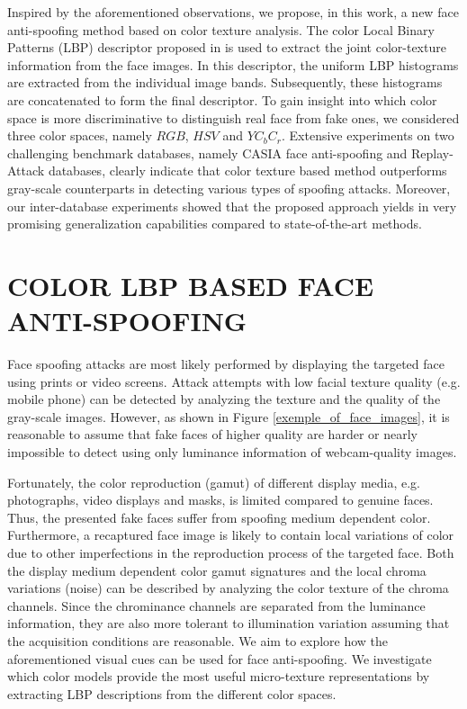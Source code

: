 \documentclass{article}
\begin{document}
Inspired by the aforementioned observations, we propose, in this work, a new face anti-spoofing method based on color texture analysis. The color Local Binary Patterns (LBP) descriptor proposed in \cite{color_lbp} is used to extract the joint color-texture information from the face images. In this descriptor, the uniform LBP histograms are extracted from the individual image bands. Subsequently, these histograms are concatenated to form the final descriptor. To gain insight into which color space is more discriminative to distinguish real face from fake ones, we considered three color spaces, namely $RGB$, $HSV$ and $YC_bC_r$. Extensive experiments on two challenging benchmark databases, namely CASIA face anti-spoofing and Replay-Attack databases, clearly indicate that color texture based method outperforms gray-scale counterparts in detecting various types of spoofing attacks. Moreover, our inter-database experiments showed that the proposed approach yields in very promising generalization capabilities compared to state-of-the-art methods.



\vspace{-4mm}
\section{COLOR LBP BASED FACE ANTI-SPOOFING }
	\vspace{-2mm}
\label{sec:lbp}

Face spoofing attacks are most likely performed by displaying the targeted face using prints or video screens. Attack attempts with low facial texture quality (e.g. mobile phone) can be detected by analyzing the texture and the quality of the gray-scale images. However, as shown in Figure \ref{exemple_of_face_images}, it is reasonable to assume that fake faces of higher quality are harder or nearly impossible to detect using only luminance information of webcam-quality images.

Fortunately, the color reproduction (gamut) of different display media, e.g. photographs, video displays and masks, is limited compared to genuine faces. Thus, the presented fake faces suffer from spoofing medium dependent color. Furthermore, a recaptured face image is likely to contain local variations of color due to other imperfections in the reproduction process of the targeted face. Both the display medium dependent color gamut signatures and the local chroma variations (noise) can be described by analyzing the color texture of the chroma channels. Since the chrominance channels are separated from the luminance information, they are also more tolerant to illumination variation assuming that the acquisition conditions are reasonable. We aim to explore how the aforementioned visual cues can be used for face anti-spoofing. We investigate which color models provide the most useful micro-texture representations by extracting LBP descriptions from the different color spaces.  
\end{document}
